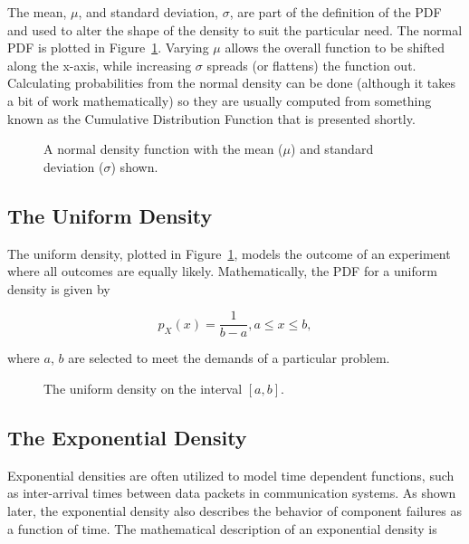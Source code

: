 The mean, $\mu$, and standard deviation, $\sigma$, are part of the
definition of the PDF and used to alter the shape of the density to suit
the particular need. The normal PDF is plotted in 
Figure~\ref{figure:normalDensityFunction}. Varying
$\mu$ allows the overall function to be shifted along the x-axis,
while increasing $\sigma$ spreads (or flattens) the function out.
Calculating probabilities from the normal density can be done (although
it takes a bit of work mathematically) so they are usually computed from
something known as the Cumulative Distribution Function that is
presented shortly.

\begin{figure}
\caption{A normal density function with the mean ($\mu$)
and standard deviation ($\sigma$) shown.}
\label{figure:normalDensityFunction}
\end{figure}


\subsection*{The Uniform Density}
\label{subsection:the-uniform-density}


The uniform density, plotted in 
Figure~\ref{figure:normalDensityFunction}, models the outcome of an
experiment where all outcomes are equally likely. Mathematically, the
PDF for a uniform density is given by

\begin{equation}
\label{equ:uniformDensity}
p_X(x) = \frac{1}{b-a}, a \leq x \leq b,
\end{equation}

where $a$, $b$ are selected to meet the demands of a particular problem.


\begin{figure}
\caption{The uniform density on the interval $[ a,b ]$.}
\label{figure:uniformDensityFunction}
\end{figure}


\subsection*{The Exponential Density}
\label{subsection:the-exponential-density}


Exponential densities are often utilized to model time dependent
functions, such as inter-arrival times between data packets in
communication systems. As shown later, the exponential density also
describes the behavior of component failures as a function of time. The
mathematical description of an exponential density is

